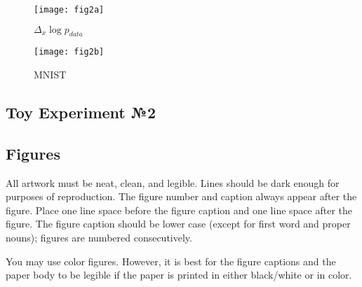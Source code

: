 \documentclass{article}
\begin{document}
\begin{figure}[H]
  \centering
  	\texttt{[image: fig2a]}
  	\caption{$\Delta_x \log p_{data}$}
  	\label{fig:2a}
\end{figure}

\begin{figure}[H]
	\centering
	\texttt{[image: fig2b]}
	\caption{MNIST}
	\label{fig:2b}
\end{figure}

\subsection{Toy Experiment №2}










\subsection{Figures}


All artwork must be neat, clean, and legible. Lines should be dark enough for
purposes of reproduction. The figure number and caption always appear after the
figure. Place one line space before the figure caption and one line space after
the figure. The figure caption should be lower case (except for first word and
proper nouns); figures are numbered consecutively.

You may use color figures.  However, it is best for the figure captions and the
paper body to be legible if the paper is printed in either black/white or in
color.



 
 
\end{document}
